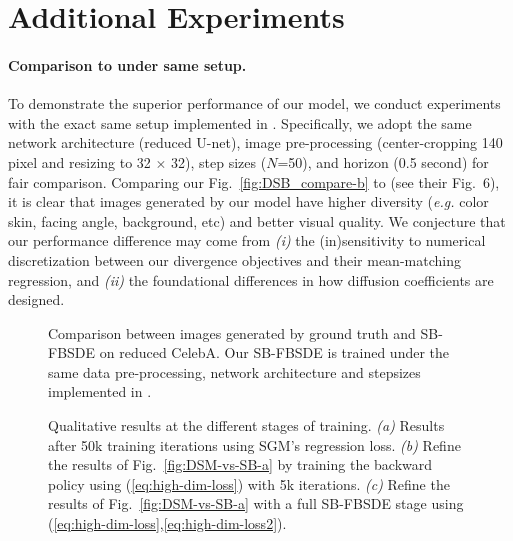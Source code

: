 \documentclass{article}
\def\eqref#1{(\ref{#1})}
\newcommand{\eg}{{\ignorespaces\emph{e.g.}}{ }}
\begin{document}
\section{Additional Experiments}
\label{appendix:addtional_fig}


\paragraph{Comparison to \citet{de2021diffusion} under same setup.}


To demonstrate the superior performance of our model, we conduct experiments with the exact same setup implemented in \citet{de2021diffusion}. Specifically, we adopt the same network architecture (reduced U-net), image pre-processing (center-cropping 140 pixel and resizing to 32 $\times$ 32), step sizes ($N$=50), and horizon (0.5 second) for fair comparison.
Comparing our Fig.~\ref{fig:DSB_compare-b} to \citet{de2021diffusion} (see their Fig.~6), it is clear that images generated by our model have higher diversity (\eg color skin, facing angle, background, etc) and better visual quality. We conjecture that our performance difference may come from \textit{(i)} the (in)sensitivity to numerical discretization between our divergence objectives and their mean-matching regression, and \textit{(ii)} the foundational differences in how diffusion coefficients are designed.


\begin{figure}[H]\centering
  \qquad
  \caption{Comparison between images generated by ground truth and SB-FBSDE on reduced CelebA. Our SB-FBSDE is trained under the same data pre-processing, network architecture and stepsizes implemented in \citet{de2021diffusion}. }\label{fig:DSB_compare}\end{figure}

\begin{figure}[H]
  \vskip -0.3in
  \centering
  \qquad
  \qquad
  \caption{
      Qualitative results at the different stages of training.
      \textit{(a)} Results after 50k training iterations using SGM's regression loss.
      \textit{(b)} Refine the results of Fig.~\ref{fig:DSM-vs-SB-a} by training the backward policy using \eqref{eq:high-dim-loss} with 5k iterations.
      \textit{(c)} Refine the results of Fig.~\ref{fig:DSM-vs-SB-a} with a full SB-FBSDE stage using (\ref{eq:high-dim-loss},\ref{eq:high-dim-loss2}).
  }\label{fig:DSM-vs-SB}\end{figure}
\end{document}
